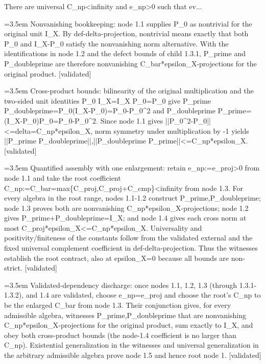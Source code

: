 \documentclass{article}
\newcommand{\step}[1]{\par\noindent\hangindent=3.5em\hangafter=1%
  \makebox[3.5em][l]{\textbf{#1.}}}
\newcommand{\steptag}[1]{\hfill{\small\textsf{[#1]}}}
\begin{document}
\begin{proofbox}{There are universal C\_np<infinity and e\_np>0 such that ev...}
\step{1.3.2} Nonvanishing bookkeeping: node 1.1 supplies P\_0 as nontrivial for the original unit I\_X. By def-delta-projection, nontrivial means exactly that both P\_0 and I\_X-P\_0 satisfy the nonvanishing norm alternative. With the identifications in node 1.2 and the defect bounds of child 1.3.1, P\_prime and P\_doubleprime are therefore nonvanishing C\_bar*epsilon\_X-projections for the original product. \steptag{validated} \\[4pt]
\step{1.4} Cross-product bounds: bilinearity of the original multiplication and the two-sided unit identities P\_0 I\_X=I\_X P\_0=P\_0 give P\_prime P\_doubleprime=P\_0(I\_X-P\_0)=P\_0-P\_0\textasciicircum{}2 and P\_doubleprime P\_prime=(I\_X-P\_0)P\_0=P\_0-P\_0\textasciicircum{}2. Since node 1.1 gives ||P\_0\textasciicircum{}2-P\_0||<=delta=C\_np*epsilon\_X, norm symmetry under multiplication by -1 yields ||P\_prime P\_doubleprime||,||P\_doubleprime P\_prime||<=C\_np*epsilon\_X. \steptag{validated} \\[4pt]
\step{1.5} Quantified assembly with one enlargement: retain e\_np:=e\_proj>0 from node 1.1 and take the root coefficient C\_np:=C\_bar=max\{C\_proj,C\_proj+C\_cmp\}<infinity from node 1.3. For every algebra in the root range, nodes 1.1-1.2 construct P\_prime,P\_doubleprime; node 1.3 proves both are nonvanishing C\_np*epsilon\_X-projections; node 1.2 gives P\_prime+P\_doubleprime=I\_X; and node 1.4 gives each cross norm at most C\_proj*epsilon\_X<=C\_np*epsilon\_X. Universality and positivity/finiteness of the constants follow from the validated external and the fixed universal complement coefficient in def-delta-projection. Thus the witnesses establish the root contract, also at epsilon\_X=0 because all bounds are non-strict. \steptag{validated} \\[6pt]
\step{1.5.1} Validated-dependency discharge: once nodes 1.1, 1.2, 1.3 (through 1.3.1-1.3.2), and 1.4 are validated, choose e\_np=e\_proj and choose the root's C\_np to be the enlarged C\_bar from node 1.3. Their conjunction gives, for every admissible algebra, witnesses P\_prime,P\_doubleprime that are nonvanishing C\_np*epsilon\_X-projections for the original product, sum exactly to I\_X, and obey both cross-product bounds (the node-1.4 coefficient is no larger than C\_np). Existential generalization in the witnesses and universal generalization in the arbitrary admissible algebra prove node 1.5 and hence root node 1. \steptag{validated} \\[4pt]
\end{proofbox}
\end{document}
